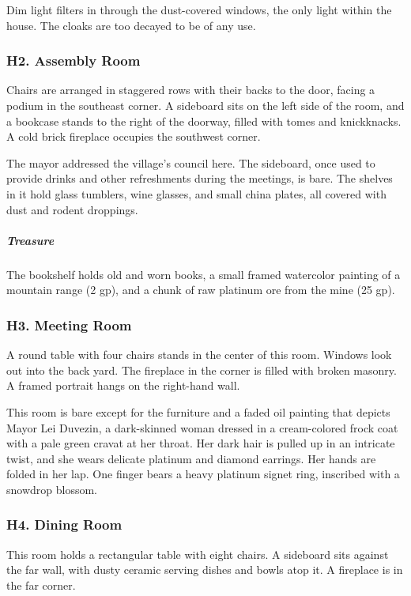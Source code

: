 \documentclass[10pt,a4paper,twoside,bg=print,twocolumn,openany,nodeprecatedcode]{dndbook}
\begin{document}
Dim light filters in through the dust-covered windows, the only light within the house. The cloaks are too decayed to be of any use.

\subsubsection{H2. Assembly Room}
\begin{DndReadAloud}{}
Chairs are arranged in staggered rows with their backs to the door, facing a podium in the southeast corner. A sideboard sits on the left side of the room, and a bookcase stands to the right of the doorway, filled with tomes and knickknacks. A cold brick fireplace occupies the southwest corner.

\end{DndReadAloud}

The mayor addressed the village's council here. The sideboard, once used to provide drinks and other refreshments during the meetings, is bare. The shelves in it hold glass tumblers, wine glasses, and small china plates, all covered with dust and rodent droppings.

\subparagraph{Treasure}
The bookshelf holds old and worn books, a small framed watercolor painting of a mountain range (2 gp), and a chunk of raw platinum ore from the mine (25 gp).

\subsubsection{H3. Meeting Room}
\begin{DndReadAloud}{}
A round table with four chairs stands in the center of this room. Windows look out into the back yard. The fireplace in the corner is filled with broken masonry. A framed portrait hangs on the right-hand wall.

\end{DndReadAloud}

This room is bare except for the furniture and a faded oil painting that depicts Mayor Lei Duvezin, a dark-skinned woman dressed in a cream-colored frock coat with a pale green cravat at her throat. Her dark hair is pulled up in an intricate twist, and she wears delicate platinum and diamond earrings. Her hands are folded in her lap. One finger bears a heavy platinum signet ring, inscribed with a snowdrop blossom.

\subsubsection{H4. Dining Room}
\begin{DndReadAloud}{}
This room holds a rectangular table with eight chairs. A sideboard sits against the far wall, with dusty ceramic serving dishes and bowls atop it. A fireplace is in the far corner.

\end{DndReadAloud}
\end{document}

